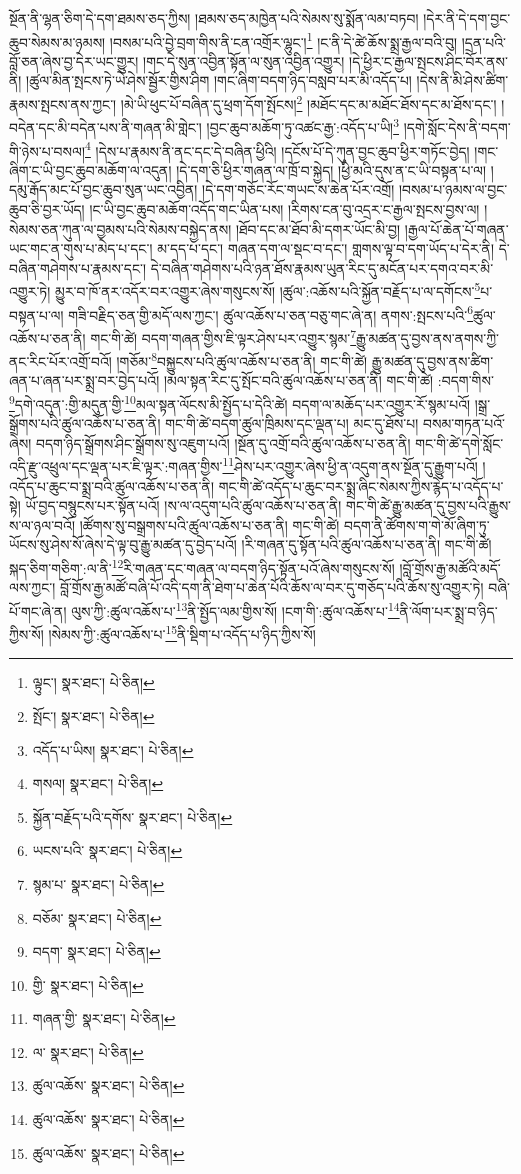 སྔོན་ནི་ལྷན་ཅིག་དེ་དག་ཐམས་ཅད་ཀྱིས། །ཐམས་ཅད་མཁྱེན་པའི་སེམས་སུ་སྨོན་ལམ་བཏབ། །དེར་ནི་དེ་དག་བྱང་ཆུབ་སེམས་མ་ཉམས། །བསམ་པའི་བྱེ་བྲག་གིས་ནི་ངན་འགྲོར་ལྷུང་།\footnote{ལྟུང་།  སྣར་ཐང་།  པེ་ཅིན། } །ང་ནི་དེ་ཚེ་ཆོས་སྨྲ་རྒྱལ་བའི་བུ། །དྲན་པའི་བློ་ཅན་ཞེས་བྱ་དེར་ཡང་གྱུར། །གང་དེ་སུན་འབྱིན་སྟོན་ལ་སུན་འབྱིན་འགྱུར། །དེ་ཕྱིར་ང་རྒྱལ་སྤངས་ཤིང་བོར་ནས་ནི། །ཚུལ་མིན་སྤངས་ཏེ་ཡེ་ཤེས་སྦྱོར་གྱིས་ཤིག །གང་ཞིག་བདག་ཉིད་བསླབ་པར་མི་འདོད་པ། །དེས་ནི་མི་ཤེས་ཚིག་རྣམས་སྤངས་ནས་ཀྱང་། །མེ་ཡི་ཕུང་པོ་བཞིན་དུ་ཕྲག་དོག་སྤོངས།\footnote{སྤོང་།  སྣར་ཐང་།  པེ་ཅིན། } །མཐོང་དང་མ་མཐོང་ཐོས་དང་མ་ཐོས་དང་། །བདེན་དང་མི་བདེན་པས་ནི་གཞན་མི་གླེང་། །བྱང་ཆུབ་མཆོག་ཏུ་འཚང་རྒྱ་:འདོད་པ་ཡི།\footnote{འདོད་པ་ཡིས།  སྣར་ཐང་།  པེ་ཅིན། } །དགེ་སློང་དེས་ནི་བདག་གི་ཉེས་པ་བསལ།\footnote{གསལ།  སྣར་ཐང་།  པེ་ཅིན། } །དེས་པ་རྣམས་ནི་ནང་དང་དེ་བཞིན་ཕྱིའི། །དངོས་པོ་དེ་ཀུན་བྱང་ཆུབ་ཕྱིར་གཏོང་བྱེད། །གང་ཞིག་ང་ཡི་བྱང་ཆུབ་མཆོག་ལ་འདུན། །དེ་དག་ཅི་ཕྱིར་གཞན་ལ་ཁྲོ་བ་སྐྱེད། །ཕྱི་མའི་དུས་ན་ང་ཡི་བསྟན་པ་ལ། །དམུ་རྒོད་མང་པོ་བྱང་ཆུབ་སུན་ཡང་འབྱིན། །དེ་དག་གཅོང་རོང་གཡང་ས་ཆེན་པོར་འགྲོ། །བསམ་པ་ཉམས་ལ་བྱང་ཆུབ་ཅི་བྱར་ཡོད། །ང་ཡི་བྱང་ཆུབ་མཆོག་འདོད་གང་ཡིན་པས། །རིགས་ངན་བུ་འདྲར་ང་རྒྱལ་སྤངས་བྱས་ལ། །སེམས་ཅན་ཀུན་ལ་བྱམས་པའི་སེམས་བསྐྱེད་ནས། །ཐོབ་དང་མ་ཐོབ་མི་དགར་ཡོང་མི་བྱ། །རྒྱལ་པོ་ཆེན་པོ་གཞན་ཡང་གང་ན་གུས་པ་མེད་པ་དང་། མ་དད་པ་དང་། གཞན་དག་ལ་སྡང་བ་དང་། གླགས་ལྟ་བ་དག་ཡོད་པ་དེར་ནི། དེ་བཞིན་གཤེགས་པ་རྣམས་དང་། དེ་བཞིན་གཤེགས་པའི་ཉན་ཐོས་རྣམས་ཡུན་རིང་དུ་མངོན་པར་དགའ་བར་མི་འགྱུར་ཏེ། མྱུར་བ་ཁོ་ནར་འདོར་བར་འགྱུར་ཞེས་གསུངས་སོ། །ཚུལ་:འཆོས་པའི་སྐྱོན་བརྗོད་པ་ལ་དགོངས་\footnote{སྐྱོན་བརྗོད་པའི་དགོས་  སྣར་ཐང་།  པེ་ཅིན། }པ་བསྟན་པ་ལ། གཟི་བརྗིད་ཅན་གྱི་མདོ་ལས་ཀྱང་། ཚུལ་འཆོས་པ་ཅན་བཅུ་གང་ཞེ་ན། ནགས་:སྤངས་པའི་\footnote{ཡངས་པའི་  སྣར་ཐང་།  པེ་ཅིན། }ཚུལ་འཆོས་པ་ཅན་ནི། གང་གི་ཚེ། བདག་གཞན་གྱིས་ཇི་ལྟར་ཤེས་པར་འགྱུར་སྙམ་\footnote{སྙམ་པ་  སྣར་ཐང་།  པེ་ཅིན། }རྒྱུ་མཚན་དུ་བྱས་ནས་ནགས་ཀྱི་ནང་རིང་པོར་འགྲོ་བའོ། །གཅོམ་\footnote{བཅོམ་  སྣར་ཐང་།  པེ་ཅིན། }བསྐྱུངས་པའི་ཚུལ་འཆོས་པ་ཅན་ནི། གང་གི་ཚེ། རྒྱུ་མཚན་དུ་བྱས་ནས་ཚིག་ཞན་པ་ཞན་པར་སྨྲ་བར་བྱེད་པའོ། །མལ་སྟན་རིང་དུ་སྤོང་བའི་ཚུལ་འཆོས་པ་ཅན་ནི། གང་གི་ཚེ། :བདག་གིས་\footnote{བདག་  སྣར་ཐང་།  པེ་ཅིན། }དགེ་འདུན་:གྱི་མདུན་གྱི་\footnote{གྱི་  སྣར་ཐང་།  པེ་ཅིན། }མལ་སྟན་ལོངས་མི་སྤྱོད་པ་དེའི་ཚེ། བདག་ལ་མཆོད་པར་འགྱུར་རོ་སྙམ་པའོ། །སྒྲ་སྒྲོགས་པའི་ཚུལ་འཆོས་པ་ཅན་ནི། གང་གི་ཚེ་བདག་ཚུལ་ཁྲིམས་དང་ལྡན་པ། མང་དུ་ཐོས་པ། བསམ་གཏན་པའོ་ཞེས། བདག་ཉིད་སྒྲོགས་ཤིང་སྒྲོགས་སུ་འཇུག་པའོ། །སྔོན་དུ་འགྲོ་བའི་ཚུལ་འཆོས་པ་ཅན་ནི། གང་གི་ཚེ་དགེ་སློང་འདི་རྫུ་འཕྲུལ་དང་ལྡན་པར་ཇི་ལྟར་:གཞན་གྱིས་\footnote{གཞན་གྱི་  སྣར་ཐང་།  པེ་ཅིན། }ཤེས་པར་འགྱུར་ཞེས་ཕྱི་ན་འདུག་ནས་སྔོན་དུ་རྒྱུག་པའོ། །འདོད་པ་ཆུང་བ་སྨྲ་བའི་ཚུལ་འཆོས་པ་ཅན་ནི། གང་གི་ཚེ་འདོད་པ་ཆུང་བར་སྨྲ་ཞིང་སེམས་ཀྱིས་རྙེད་པ་འདོད་པ་སྟེ། ཡོ་བྱད་བསྙུངས་པར་སྟོན་པའོ། །ས་ལ་འདུག་པའི་ཚུལ་འཆོས་པ་ཅན་ནི། གང་གི་ཚེ་རྒྱུ་མཚན་དུ་བྱས་པའི་རྒྱུས་ས་ལ་ཉལ་བའོ། །ཚོགས་སུ་བསྒྲགས་པའི་ཚུལ་འཆོས་པ་ཅན་ནི། གང་གི་ཚེ། བདག་ནི་ཚོགས་ག་གེ་མོ་ཞིག་ཏུ་ཡོངས་སུ་ཤེས་སོ་ཞེས་དེ་ལྟ་བུ་རྒྱུ་མཚན་དུ་བྱེད་པའོ། །རི་གཞན་དུ་སྟོན་པའི་ཚུལ་འཆོས་པ་ཅན་ནི། གང་གི་ཚེ། སྐད་ཅིག་གཅིག་:ལ་ནི་\footnote{ལ་  སྣར་ཐང་།  པེ་ཅིན། }རི་གཞན་དང་གཞན་ལ་བདག་ཉིད་སྟོན་པའོ་ཞེས་གསུངས་སོ། །བློ་གྲོས་རྒྱ་མཚོའི་མདོ་ལས་ཀྱང་། བློ་གྲོས་རྒྱ་མཚོ་བཞི་པོ་འདི་དག་ནི་ཐེག་པ་ཆེན་པོའི་ཆོས་ལ་བར་དུ་གཅོད་པའི་ཆོས་སུ་འགྱུར་ཏེ། བཞི་པོ་གང་ཞེ་ན། ལུས་ཀྱི་:ཚུལ་འཆོས་པ་\footnote{ཚུལ་འཆོས་  སྣར་ཐང་།  པེ་ཅིན། }ནི་སྤྱོད་ལམ་གྱིས་སོ། །ངག་གི་:ཚུལ་འཆོས་པ་\footnote{ཚུལ་འཆོས་  སྣར་ཐང་།  པེ་ཅིན། }ནི་ལོག་པར་སྨྲ་བ་ཉིད་ཀྱིས་སོ། །སེམས་ཀྱི་:ཚུལ་འཆོས་པ་\footnote{ཚུལ་འཆོས་  སྣར་ཐང་།  པེ་ཅིན། }ནི་སྡིག་པ་འདོད་པ་ཉིད་ཀྱིས་སོ། 